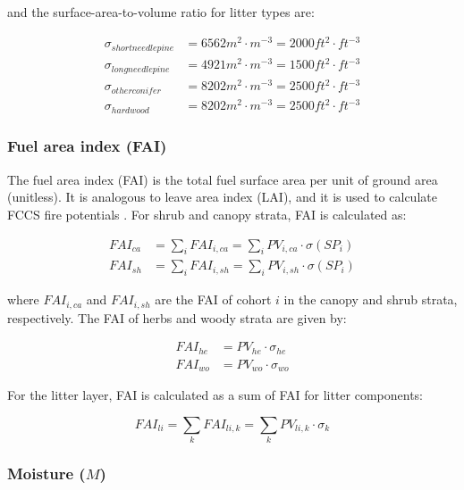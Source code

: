 \documentclass[]{book}
\begin{document}
and the surface-area-to-volume ratio for litter types are:

\begin{eqnarray}
\sigma_{shortneedlepine} &= 6562 m^{2}\cdot m^{-3}= 2000 ft^{2}\cdot ft^{-3}\\
\sigma_{longneedlepine} &= 4921 m^{2}\cdot m^{-3}= 1500 ft^{2}\cdot ft^{-3}\\
\sigma_{otherconifer} &= 8202 m^{2}\cdot m^{-3}= 2500 ft^{2}\cdot ft^{-3}\\
\sigma_{hardwood} &= 8202 m^{2}\cdot m^{-3}= 2500 ft^{2}\cdot ft^{-3}
\end{eqnarray}

\subsubsection{Fuel area index (FAI)}\label{fuel-area-index-fai}

The fuel area index (FAI) is the total fuel surface area per unit of
ground area (unitless). It is analogous to leave area index (LAI), and
it is used to calculate FCCS fire potentials \citep{Schaaf2007}. For
shrub and canopy strata, FAI is calculated as:

\begin{eqnarray}
FAI_{ca} &= \sum_{i}{FAI_{i, ca}} = \sum_{i}{PV_{i,ca} \cdot\sigma(SP_i)}\\
FAI_{sh} &= \sum_{i}{FAI_{i, sh}}= \sum_{i}{PV_{i,sh} \cdot \sigma(SP_i)}
\end{eqnarray}

where \(FAI_{i, ca}\) and \(FAI_{i, sh}\) are the FAI of cohort \(i\) in
the canopy and shrub strata, respectively. The FAI of herbs and woody
strata are given by:

\begin{eqnarray}
FAI_{he} &= PV_{he} \cdot \sigma_{he}\\
FAI_{wo} &= PV_{wo} \cdot \sigma_{wo}
\end{eqnarray}

For the litter layer, FAI is calculated as a sum of FAI for litter
components:

\begin{equation}
FAI_{li} = \sum_{k}{FAI_{li,k}} = \sum_{k}{PV_{li,k} \cdot \sigma_{k}}
\end{equation}

\subsubsection{\texorpdfstring{Moisture
(\(M\))}{Moisture (M)}}\label{moisture-m}
\end{document}
